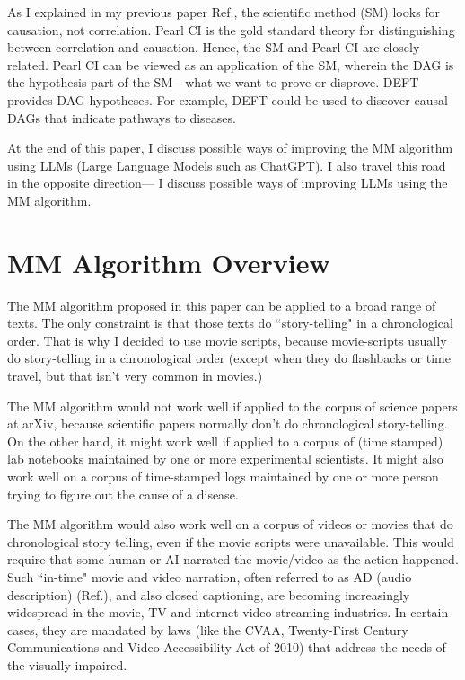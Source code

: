 \documentclass[12pt]{article}
\begin{document}
As I explained in my previous paper Ref.\cite{deft1}, the scientific method (SM) looks for causation, not correlation. Pearl CI is the gold standard theory for distinguishing
between correlation and causation.
Hence, the SM and Pearl CI are closely related.
Pearl CI can be viewed as an application of the SM, wherein the DAG is the hypothesis part of the SM---what we want to  
prove or disprove.
DEFT provides DAG hypotheses.
For example,
DEFT could be used to discover causal DAGs that indicate pathways to diseases.

At the end of this paper, I discuss possible ways of improving the MM algorithm 
using LLMs (Large
Language Models such as ChatGPT).
I also travel this road in the opposite direction---
I discuss
possible ways of improving
LLMs using the MM algorithm.


\section{MM Algorithm Overview}
\label{sec-algo-overview}
The MM algorithm proposed in this
paper can be applied to a broad range of texts. The only constraint is that those texts 
do ``story-telling" in a chronological order.
That is why I decided to use movie scripts,
because movie-scripts usually do story-telling in a chronological order (except when they do 
flashbacks or time travel, but that isn't very
common in movies.)

The MM algorithm would not work well
if applied to the corpus of science papers at arXiv,
because scientific papers normally don't do chronological story-telling. 
On the other hand,
it might work well if applied to a corpus of (time stamped) lab notebooks maintained by one or more experimental scientists.
It might also work well on a corpus of time-stamped logs maintained by one or more person
trying to figure out the cause of a disease.

The MM algorithm would also
work well on a corpus of videos or movies that
do chronological story telling,
even if the movie scripts were unavailable. This
would require that  
some human or AI
narrated the movie/video as the action happened. Such ``in-time" movie and video narration,
often referred to as AD (audio description)
(Ref.\cite{audio-description}),
and also closed captioning, are becoming 
increasingly
widespread in the movie, TV and internet video streaming industries. In certain cases, 
they are mandated by laws 
(like the CVAA, Twenty-First Century Communications and Video Accessibility Act of 2010) that
address the needs of the visually impaired.
\end{document}
